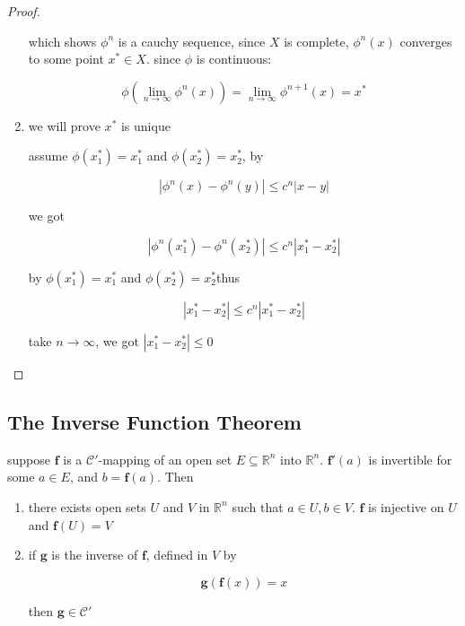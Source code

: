 \begin{proof}
\begin{enumerate}
        which shows $\phi^n$ is a cauchy sequence, since $X$ is complete, $\phi^{n}(x)$ converges to some point $x^* \in X$.
        since $\phi$ is continuous:

        \[
            \phi(\lim_{n \to \infty}\phi^n(x)) = \lim_{n \to \infty} \phi^{n+1}(x) = x^*
        \]

        \item we will prove $x^*$ is unique
        
        assume $\phi(x^*_1) = x^*_1$ and $\phi(x^*_2) = x^*_2$, by

        \[
            \left| \phi^{n}(x) - \phi^{n}(y) \right| \le c^n \left| x - y \right|
        \]

        we got

        \[
            \left| \phi^{n}(x^*_1) - \phi^{n}(x^*_2) \right| \le c^n \left| x^*_1 - x^*_2 \right|
        \]

        by $\phi(x^*_1) = x^*_1$ and  $\phi(x^*_2) = x^*_2$thus

        \[
            \left| x^*_1 - x^*_2 \right| \le c^n \left| x^*_1 - x^*_2 \right|
        \]

        take $n \to \infty$, we got $\left| x^*_1 - x^*_2 \right| \le 0$
    \end{enumerate}


\end{proof}

\subsection{The Inverse Function Theorem}

\begin{thm}
    \label{47ef7de4-f145-4883-970b-73c8157de091}
    suppose $\mathbf{f}$ is a $\mathscr{C}'$-mapping of an open set $E \subseteq \mathbb{R}^n$ into $\mathbb{R}^n$.
    $\mathbf{f}'(a)$ is invertible for some $a \in E$, and $b = \mathbf{f}(a)$. Then

    \begin{enumerate}
        \item there exists open sets $U$ and $V$  in $\mathbb{R}^n$ such that
        $a \in U, b \in V$. $\mathbf{f}$ is injective on $U$ and $\mathbf{f}(U)= V$

        \item if $\mathbf{g}$ is the inverse of $\mathbf{f}$, defined in $V$ by

        \[
            \mathbf{g}(\mathbf{f}(x)) = x
        \]

        then $\mathbf{g} \in \mathscr{C}'$
    \end{enumerate}
\end{thm}

